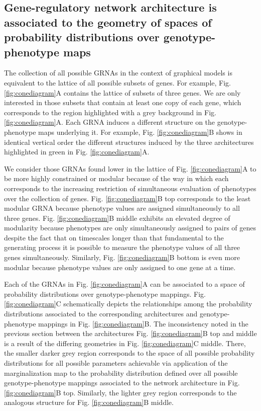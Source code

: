 \subsection*{Gene-regulatory network architecture is associated to the geometry of spaces of probability distributions over genotype-phenotype maps}
The collection of all possible GRNAs in the context of graphical models is equivalent to the lattice of all possible subsets of genes. For example, Fig. \ref{fig:conediagram}A contains the lattice of subsets of three genes. We are only interested in those subsets that contain at least one copy of each gene, which corresponds to the region highlighted with a grey background in Fig. \ref{fig:conediagram}A. Each GRNA induces a different structure on the genotype-phenotype maps underlying it. For example, Fig. \ref{fig:conediagram}B shows in identical vertical order the different structures induced by the three architectures highlighted in green in Fig. \ref{fig:conediagram}A.

We consider those GRNAs found lower in the lattice of Fig. \ref{fig:conediagram}A to be more highly constrained or modular because of the way in which each corresponds to the increasing restriction of simultaneous evaluation of phenotypes over the collection of genes. Fig. \ref{fig:conediagram}B top corresponds to the least modular GRNA because phenotype values are assigned simultaneously to all three genes. Fig. \ref{fig:conediagram}B middle exhibits an elevated degree of modularity because phenotypes are only simultaneously assigned to pairs of genes despite the fact that on timescales longer than that fundamental to the generating process it is possible to measure the phenotype values of all three genes simultaneously. Similarly, Fig. \ref{fig:conediagram}B bottom is even more modular because phenotype values are only assigned to one gene at a time.

Each of the GRNAs in Fig. \ref{fig:conediagram}A can be associated to a space of probability distributions over genotype-phenotype mappings. Fig. \ref{fig:conediagram}C schematically depicts the relationships among the probability distributions associated to the corresponding architectures and genotype-phenotype mappings in Fig. \ref{fig:conediagram}B. The inconsistency noted in the previous section between the architectures Fig. \ref{fig:conediagram}B top and middle is a result of the differing geometries in Fig. \ref{fig:conediagram}C middle. There, the smaller darker grey region corresponds to the space of all possible probability distributions for all possible parameters achievable via application of the marginalization map to the probability distribution defined over all possible genotype-phenotype mappings associated to the network architecture in Fig. \ref{fig:conediagram}B top. Similarly, the lighter grey region corresponds to the analogous structure for Fig. \ref{fig:conediagram}B middle.

